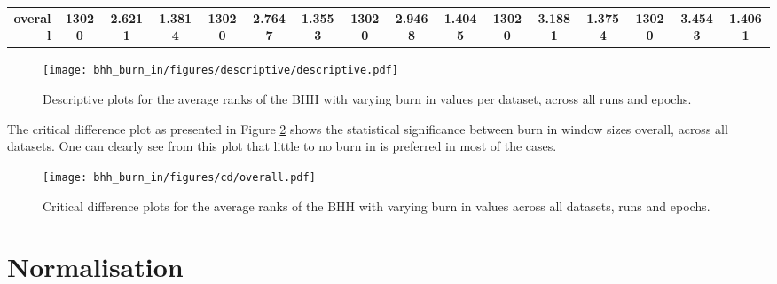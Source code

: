 \begin{table}[htbp]
{\begin{tabular}{rccccccccccccccc}
			\midrule
			\textbf{overall}                    & \textbf{13020}                       & \cellcolor[rgb]{ .776,  .937,  .808}\textcolor[rgb]{ 0,  .38,  0}{\textbf{2.6211}} & \textbf{1.3814} & \textbf{13020} & \textbf{2.7647}                                                           & \textbf{1.3553} & \textbf{13020} & \textbf{2.9468}                                                           & \textbf{1.4045} & \textbf{13020} & \textbf{3.1881}                                                           & \textbf{1.3754} & \textbf{13020} & \textbf{3.4543} & \textbf{1.4061} \\
		\end{tabular}%
	}
\end{table}%

\begin{figure}[htbp]
	\centering
	\texttt{[image: bhh\_burn\_in/figures/descriptive/descriptive.pdf]}
	\caption{Descriptive plots for the average ranks of the \acs{BHH} with varying burn in values per dataset, across all runs and epochs.}
	\label{fig:results:burn_in:descriptive:descriptive}
\end{figure}

The critical difference plot as presented in Figure \ref{fig:results:burn_in:descriptive:cd} shows the statistical significance between burn in window sizes overall, across all datasets. One can clearly see from this plot that little to no burn in is preferred in most of the cases.


\begin{figure}[htbp]
	\centering
	\texttt{[image: bhh\_burn\_in/figures/cd/overall.pdf]}
	\caption{Critical difference plots for the average ranks of the \acs{BHH} with varying burn in values across all datasets, runs and epochs.}
	\label{fig:results:burn_in:descriptive:cd}
\end{figure}

\section{Normalisation}\label{sec:results:bhh_variant_normalise}

